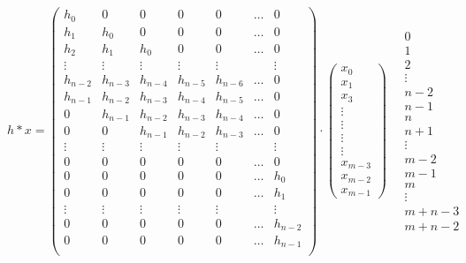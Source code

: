 \documentclass{article}
\begin{document}
\begin{equation*}
    h * x = 
    \begin{pmatrix}
    h_{0} & 0 & 0 & 0 & 0 & \dots & 0 \\
    h_{1} & h_{0} &  0 & 0 & 0  & \dots & 0 \\
    h_{2} & h_{1} & h_{0} & 0 & 0 & \dots & 0 \\
    \vdots & \vdots & \vdots & \vdots & \vdots & & \vdots \\
    h_{n-2} & h_{n-3} & h_{n-4}&h_{n-5} & h_{n-6}& \dots &0 \\
    h_{n-1} & h_{n-2} & h_{n-3} & h_{n-4}&h_{n-5} & \dots &0 \\
    0 & h_{n-1} & h_{n-2} & h_{n-3} & h_{n-4}& \dots & 0 \\
    0 & 0 & h_{n-1}& h_{n-2} & h_{n-3} & \dots & 0 \\
     \vdots & \vdots & \vdots & \vdots & \vdots & & \vdots \\
     0 & 0 & 0 & 0 & 0 & \dots & 0 \\
     0 & 0 & 0 & 0 & 0 & \dots & h_{0} \\
     0 & 0 & 0 & 0 & 0 & \dots & h_{1} \\
     \vdots & \vdots & \vdots & \vdots & \vdots & & \vdots \\
     0 & 0 & 0 & 0 & 0 & \dots & h_{n-2} \\
     0 & 0 & 0 & 0 & 0 & \dots & h_{n-1} \\
    \end{pmatrix} 
    \cdot 
    \begin{pmatrix}
    x_{0} \\ x_{1} \\ x_{3} \\ \vdots \\ \vdots \\ \vdots \\ \vdots \\ x_{m-3} \\ x_{m-2} \\x_{m-1}
    \end{pmatrix}
    \quad 
    \begin{matrix}
    0\\ 1 \\2 \\ \vdots \\ n-2 \\ n-1 \\ n \\ n+1 \\ \vdots \\ m-2\\ m-1\\ m \\ \vdots \\ m + n -3 \\ m + n - 2
    \end{matrix}
\end{equation*}
\end{document}
